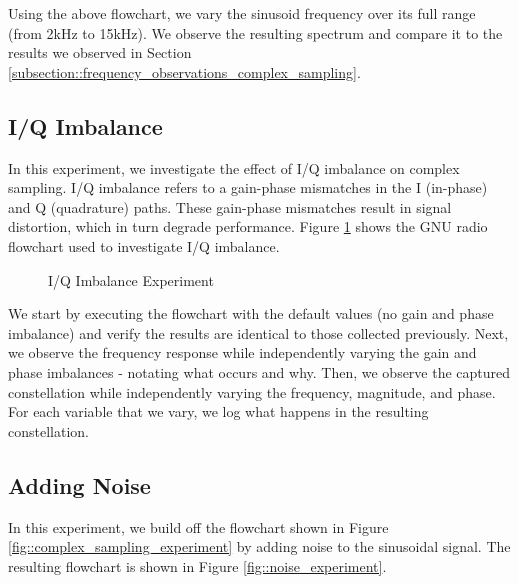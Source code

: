 \documentclass{article}
\begin{document}
Using the above flowchart, we vary the sinusoid frequency over its full range (from 2kHz to 15kHz). We observe the resulting spectrum and compare it to the results we observed in Section \ref{subsection::frequency_observations_complex_sampling}.

\subsection{I/Q Imbalance}

In this experiment, we investigate the effect of I/Q imbalance on complex sampling. I/Q imbalance refers to a gain-phase mismatches in the I (in-phase) and Q (quadrature) paths. These gain-phase mismatches result in signal distortion, which in turn degrade performance. Figure \ref{fig::iq_imbalance_experiment} shows the GNU radio flowchart used to investigate I/Q imbalance.

\begin{figure}[H]
	\centerline{}
	\caption{I/Q Imbalance Experiment}
	\label{fig::iq_imbalance_experiment}
\end{figure}

We start by executing the flowchart with the default values (no gain and phase imbalance) and verify the results are identical to those collected previously. Next, we observe the frequency response while independently varying the gain and phase imbalances - notating what occurs and why. Then, we observe the captured constellation while independently varying the frequency, magnitude, and phase. For each variable that we vary, we log what happens in the resulting constellation.  

\subsection{Adding Noise}

In this experiment, we build off the flowchart shown in Figure \ref{fig::complex_sampling_experiment} by adding noise to the sinusoidal signal. The resulting flowchart is shown in Figure \ref{fig::noise_experiment}.
\end{document}

